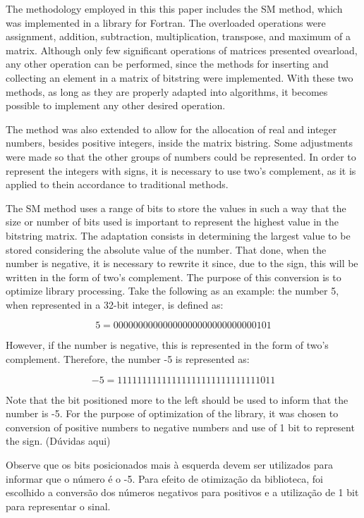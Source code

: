 \documentclass[10pt]{article}
\begin{document}
The methodology employed in this this paper includes the SM method, which was implemented in a library for Fortran. The 
overloaded operations were assignment, addition, subtraction, multiplication, transpose, and maximum of a matrix. 
Although only few significant operations of matrices presented ovearload, any other operation can be performed, since 
the methods for inserting and collecting an element in a matrix of bitstring were implemented. With these two methods, 
as long as they are properly adapted into algorithms, it becomes possible to implement any other desired operation.

The method was also extended to allow for the allocation of real and integer numbers, besides positive integers, inside 
the matrix bistring. Some adjustments were made so that the other groups of numbers could be represented. In order to 
represent the integers with signs, it is necessary to use two's complement, as it is applied to thein accordance to 
traditional methods.

The SM method uses a range of bits to store the values in such a way that
the size or number of bits used is important to represent the highest value in the bitstring matrix. The adaptation 
consists in determining the largest value to be stored considering the absolute value of the number. That done,
when the number is negative, it is necessary to rewrite it since, due to the sign, this will be written in the form of 
two's complement. The purpose of this conversion is to optimize library processing. Take the following as an example: 
the number 5, when represented in a 32-bit integer, is defined as:

\begin{equation}\nonumber
 5 = 00000000 00000000 00000000 00000101
\end{equation}

However, if the number is negative, this is represented in the form of two's complement. Therefore, the number -5 is 
represented as:

\begin{equation}\nonumber
 -5 = 11111111 11111111 11111111 11111011
\end{equation}

Note that the bit positioned more to the left should be used to inform that the number is -5. For the purpose of 
optimization of the library, it was chosen to conversion of positive numbers to negative numbers and use of 1 
bit to represent the sign. (Dúvidas aqui)

Observe que os bits posicionados mais à esquerda devem ser utilizados para 
informar que o número é o -5. Para efeito de otimização da biblioteca, foi 
escolhido a conversão dos números negativos para positivos e a utilização de 1 
bit para representar o sinal.
\end{document}
